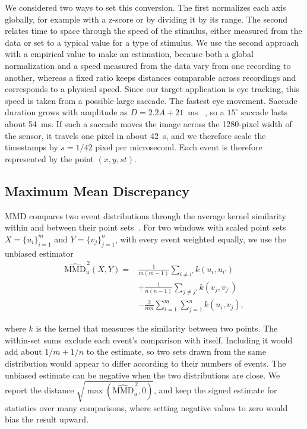 We considered two ways to set this conversion. The first normalizes each axis globally, for example with a z-score or by dividing it by its range. The second relates time to space through the speed of the stimulus, either measured from the data or set to a typical value for a type of stimulus. We use the second approach with a empirical value to make an estimation, because both a global normalization and a speed measured from the data vary from one recording to another, whereas a fixed ratio keeps distances comparable across recordings and corresponds to a physical speed. Since our target application is eye tracking, this speed is taken from a possible large saccade. The fastest eye movement. Saccade duration grows with amplitude as $D = 2.2A +21$~ms~ \cite{bahill1975mainsequence,carpenter1988movements,gibaldi2021saccade}, so a $15^\circ$ saccade lasts about 54~ms. If such a saccade moves the image across the 1280-pixel width of the sensor, it travels one pixel in about 42~\textmu s, and we therefore scale the timestamps by $s = 1/42$ pixel per microsecond. Each event is therefore represented by the point $(x, y, st)$.


\subsection{Maximum Mean Discrepancy}
\label{sec:mmd}


MMD compares two event distributions through the average kernel similarity within and between their point sets~\cite{gretton2012kernel}. For two windows with scaled point sets $X=\{u_i\}_{i=1}^{m}$ and $Y=\{v_j\}_{j=1}^{n}$, with every event weighted equally, we use the unbiased estimator
\begin{equation}
\begin{split}
  \widehat{\mathrm{MMD}}_u^{\,2}(X,Y) = {}& \frac{1}{m(m-1)} \sum_{i \ne i'} k(u_i,u_{i'}) \\
  &+ \frac{1}{n(n-1)} \sum_{j \ne j'} k(v_j,v_{j'}) \\
  &- \frac{2}{mn} \sum_{i=1}^{m} \sum_{j=1}^{n} k(u_i,v_j),
\end{split}
\label{eq:mmd}
\end{equation}

where $k$ is the kernel that measures the similarity between two points. The within-set sums exclude each event's comparison with itself. Including it would add about $1/m + 1/n$ to the estimate, so two sets drawn from the same distribution would appear to differ according to their numbers of events. The unbiased estimate can be negative when the two distributions are close. We report the distance $\sqrt{\max(\widehat{\mathrm{MMD}}_u^{\,2},0)}$, and keep the signed estimate for statistics over many comparisons, where setting negative values to zero would bias the result upward.

